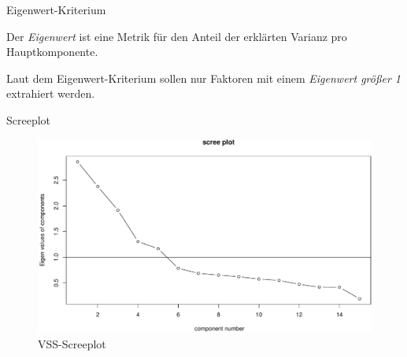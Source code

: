\begin{frame}[fragile]{Eigenwert-Kriterium}

Der \emph{Eigenwert} ist eine Metrik für den Anteil der
erklärten Varianz pro Hauptkomponente.

\begin{Shaded}
\begin{Highlighting}[]
\NormalTok{(}
\end{Highlighting}
\end{Shaded}

Laut dem Eigenwert-Kriterium sollen nur Faktoren mit einem
\emph{Eigenwert größer 1} extrahiert werden.

\end{frame}

\begin{frame}[fragile]{Screeplot}

\begin{Shaded}
\begin{Highlighting}[]
\end{Highlighting}
\end{Shaded}

\begin{figure}

{\centering \includegraphics[width=0.8\linewidth]{PraDa_Folien_nm_2_files/figure-beamer/vss-scree-1} 

}

\caption{VSS-Screeplot}\label{fig:vss-scree}
\end{figure}

\end{frame}

